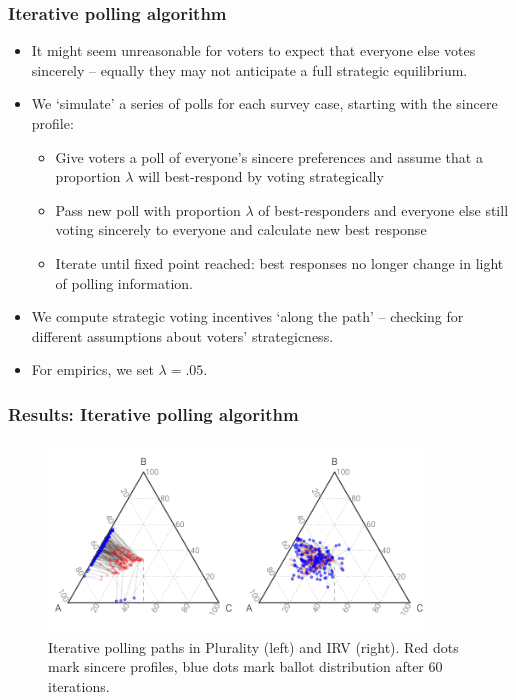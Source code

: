 \documentclass[10pt, en-GB]{beamer}
\begin{document}
\begin{frame}[t]\frametitle{Iterative polling algorithm}
    
\begin{itemize}[<+->]
	\item It might seem unreasonable for voters to expect that everyone else votes sincerely -- equally they may not anticipate a full strategic equilibrium.
	\item We `simulate' a series of polls for each survey case, starting with the sincere profile: 
		\begin{itemize}
			\item Give voters a poll of everyone's sincere preferences and assume that a proportion $\lambda$ will best-respond by voting strategically
			\item Pass new poll with proportion $\lambda$ of best-responders and everyone else still voting sincerely to everyone and calculate new best response
			\item Iterate until fixed point reached: best responses no longer change in light of polling information.
		\end{itemize}
	\item We compute strategic voting incentives `along the path' -- checking for different assumptions about voters' strategicness.
	\item For empirics, we set $\lambda = .05$.
\end{itemize}

\end{frame}

\begin{frame}[t]\frametitle{Results: Iterative polling algorithm}
    
\begin{figure}
\includegraphics[width = 0.9\textwidth]{pres_fig/tatonnement_both}
\caption{Iterative polling paths in Plurality (left) and IRV (right). Red dots mark sincere profiles, blue dots mark ballot distribution after 60 iterations.}
\end{figure}

\end{frame}
\end{document}
